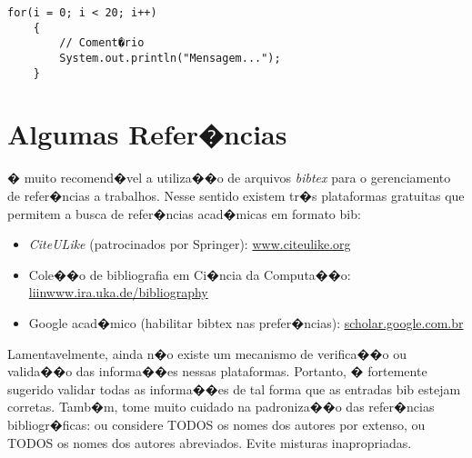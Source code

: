 \begin{lstlisting}[frame=trbl]
    for(i = 0; i < 20; i++)
    {
        // Coment�rio 
        System.out.println("Mensagem...");
    }
\end{lstlisting}


\section{Algumas Refer�ncias}
\label{sec:algumas_referencias}

� muito recomend�vel a utiliza��o de arquivos \emph{bibtex} para o gerenciamento
de refer�ncias a trabalhos. Nesse sentido existem tr�s plataformas gratuitas
que permitem a busca de refer�ncias acad�micas em formato bib: 
\begin{itemize}
	\item \emph{CiteULike} (patrocinados por Springer): \url{www.citeulike.org}
	\item Cole��o de bibliografia em Ci�ncia da Computa��o: \url{liinwww.ira.uka.de/bibliography}
	\item Google acad�mico (habilitar bibtex nas prefer�ncias): \url{scholar.google.com.br}
\end{itemize}
Lamentavelmente, ainda n�o existe um mecanismo de verifica��o ou valida��o das
informa��es nessas plataformas. Portanto, � fortemente sugerido validar todas
as informa��es de tal forma que as entradas bib estejam corretas.  Tamb�m, tome
muito cuidado na padroniza��o das refer�ncias bibliogr�ficas: ou considere TODOS
os nomes dos autores por extenso, ou TODOS os nomes dos autores abreviados.
Evite misturas inapropriadas.

